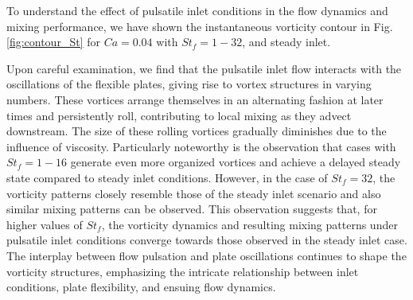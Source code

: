 \documentclass[%
aip,
amsmath,amssymb,
reprint,
]{revtex4-1}
\begin{document}
			To understand the effect of pulsatile inlet conditions in the flow dynamics and mixing performance, we have shown the instantaneous vorticity contour in Fig. \ref{fig:contour_St} for $Ca=0.04$ with $St_f=1-32$, and steady inlet.
			
			Upon careful examination, we find that the pulsatile inlet flow interacts with the oscillations of the flexible plates, giving rise to vortex structures in varying numbers. These vortices arrange themselves in an alternating fashion at later times and persistently roll, contributing to local mixing as they advect downstream. The size of these rolling vortices gradually diminishes due to the influence of viscosity. Particularly noteworthy is the observation that cases with $St_f = 1-16$ generate even more organized vortices and achieve a delayed steady state compared to steady inlet conditions. However, in the case of $St_f = 32$, the vorticity patterns closely resemble those of the steady inlet scenario and also similar mixing patterns can be observed. This observation suggests that, for higher values of $St_f$, the vorticity dynamics and resulting mixing patterns under pulsatile inlet conditions converge towards those observed in the steady inlet case. The interplay between flow pulsation and plate oscillations continues to shape the vorticity structures, emphasizing the intricate relationship between inlet conditions, plate flexibility, and ensuing flow dynamics.		 
\end{document}
